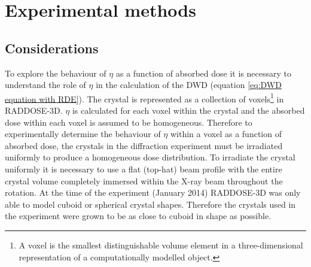 \section{Experimental methods}
\label{sec:Experimental Methods}

\subsection{Considerations}
\label{sub:Considerations}
To explore the behaviour of $\eta$ as a function of absorbed dose it is necessary to understand the role of $\eta$ in the calculation of the DWD (equation \ref{eq:DWD equation with RDE}).
The crystal is represented as a collection of voxels\footnote{A voxel is the smallest distinguishable volume element in a three-dimensional representation of a computationally modelled object.} in RADDOSE-3D.
$\eta$ is calculated for each voxel within the crystal and the absorbed dose within each voxel is assumed to be homogeneous.
Therefore to experimentally determine the behaviour of $\eta$ within a voxel as a function of absorbed dose, the crystals in the diffraction experiment must be irradiated uniformly to produce a homogeneous dose distribution.
To irradiate the crystal uniformly it is necessary to use a flat (top-hat) beam profile with the entire crystal volume completely immersed within the X-ray beam throughout the rotation.
At the time of the experiment (January 2014) RADDOSE-3D was only able to model cuboid or spherical crystal shapes.
Therefore the crystals used in the experiment were grown to be as close to cuboid in shape as possible.

